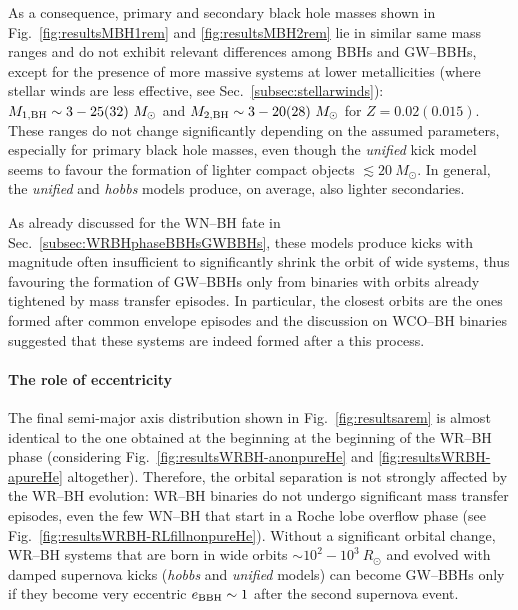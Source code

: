 \documentclass[a4paper,titlepage]{book}     	%
\newcommand{\sun}{\ensuremath{_\odot}}
\newcommand{\msun}{\ensuremath{M\sun}}
\newcommand{\rsun}{R_{\odot}}
\begin{document}
As a consequence, primary and secondary black hole masses shown in Fig.\ \ref{fig:resultsMBH1rem} and \ref{fig:resultsMBH2rem} lie in similar same mass ranges and do not exhibit relevant differences among BBHs and GW--BBHs, except for the presence of more massive systems at lower metallicities (where stellar winds are less effective, see Sec.\ \ref{subsec:stellarwinds}):  $M_{\rm 1, BH} \sim 3-25 (32)~\msun$ and $M_{\rm 2, BH} \sim 3-20 (28)~\msun$ for $Z=0.02 (0.015)$. These ranges do not change significantly depending on the assumed parameters, especially for primary black hole masses, even though the \emph{unified} kick model seems to favour the formation of lighter compact objects $\lesssim 20~\msun$. In general, the \emph{unified} and \emph{hobbs} models produce, on average, also lighter secondaries. 

As already discussed for the WN--BH fate in Sec.\ \ref{subsec:WRBHphaseBBHsGWBBHs}, these models produce kicks with magnitude often insufficient to significantly shrink the orbit of wide systems, thus favouring the formation of GW--BBHs only from binaries with orbits already tightened by mass transfer episodes. In particular, the closest orbits are the ones formed after common envelope episodes and the discussion on WCO--BH binaries suggested that these systems are indeed formed after a this process.



\paragraph{The role of eccentricity} The final semi-major axis distribution shown in Fig.\ \ref{fig:resultsarem} is almost identical to the one obtained at the beginning at the beginning of the WR--BH phase (considering Fig.\ \ref{fig:resultsWRBH-anonpureHe} and \ref{fig:resultsWRBH-apureHe} altogether). Therefore, the orbital separation is not strongly affected by the WR--BH evolution: WR--BH binaries do not undergo significant mass transfer episodes, even the few WN--BH that start in a Roche lobe overflow phase (see Fig.\ \ref{fig:resultsWRBH-RLfillnonpureHe}). Without a significant orbital change, WR--BH systems that are born in wide orbits $\sim 10^2 - 10^3~\rsun$ and evolved with damped supernova kicks (\emph{hobbs} and \emph{unified} models) can become GW--BBHs only if they become very eccentric $e_{\rm BBH} \sim 1$ after the second supernova event. 
\end{document}
